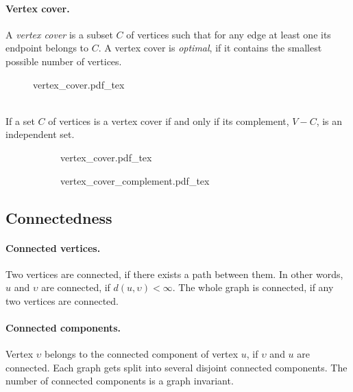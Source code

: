 \documentclass{article}
\newcommand{\incfig}[2][1]{%
    \def\svgwidth{#1\columnwidth}
    {#2.pdf_tex}
}
\begin{document}
\newpage

\paragraph{Vertex cover.}
A {\it vertex cover} is a subset $C$ of vertices such that for any edge at least one its endpoint belongs to $C$. A vertex cover is {\it optimal}, if it contains the smallest possible number of vertices.
\begin{figure}[h!]
  \centering
  \incfig{vertex_cover}
\end{figure}
\\
If a set $C$ of vertices is a vertex cover if and only if its complement, $V - C$, is an independent set.
\begin{figure}[h!]
  \centering
  \begin{subfigure}[b]{0.49\linewidth}
    \incfig{vertex_cover}
  \end{subfigure}
  \begin{subfigure}[b]{0.49\linewidth}
    \incfig{vertex_cover_complement}
  \end{subfigure}
\end{figure}

\subsection{Connectedness}

\paragraph{Connected vertices.}
Two vertices are connected, if there exists a path between them. In other words, $u$ and $\upsilon$ are connected, if $d(u, \upsilon) < \infty$. The whole graph is connected, if any two vertices are connected.

\paragraph{Connected components.}
Vertex $\upsilon$ belongs to the connected component of vertex $u$, if $\upsilon$ and $u$ are connected. Each graph gets split into several disjoint connected components. The number of connected components is a graph invariant.
\end{document}
